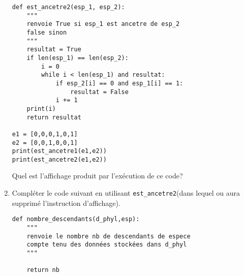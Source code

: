 \begin{enumerate}
\begin{verbatim}
def est_ancetre2(esp_1, esp_2):
    """
    renvoie True si esp_1 est ancetre de esp_2
    false sinon
    """
    resultat = True
    if len(esp_1) == len(esp_2):
        i = 0
        while i < len(esp_1) and resultat:
            if esp_2[i] == 0 and esp_1[i] == 1:
                resultat = False
            i += 1
    print(i)
    return resultat
    
e1 = [0,0,0,1,0,1]
e2 = [0,0,1,0,0,1]
print(est_ancetre1(e1,e2))
print(est_ancetre2(e1,e2))
\end{verbatim}
Quel est l'affichage produit par l'exécution de ce code?
\item Compléter le code suivant en utilisant \verb|est_ancetre2|(dans lequel ou aura supprimé l'instruction d'affichage).
\begin{verbatim}
def nombre_descendants(d_phyl,esp):
    """
    renvoie le nombre nb de descendants de espece
    compte tenu des données stockées dans d_phyl
    """
    
    return nb
\end{verbatim}

\end{enumerate}
